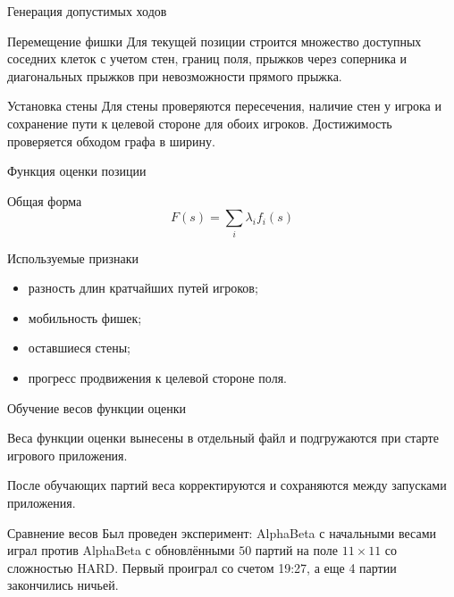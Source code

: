 \documentclass[fullscreen=true,russian,compress,%
    hyperref={unicode,bookmarks=false}]{presentation}
\begin{document}
\begin{frame}{Генерация допустимых ходов}
\begin{block}{Перемещение фишки}
Для текущей позиции строится множество доступных соседних клеток с учетом стен, границ поля, прыжков через соперника и диагональных прыжков при невозможности прямого прыжка.
\end{block}

\begin{block}{Установка стены}
Для стены проверяются пересечения, наличие стен у игрока и сохранение пути к целевой стороне для обоих игроков. Достижимость проверяется обходом графа в ширину.
\end{block}
\end{frame}

\begin{frame}{Функция оценки позиции}
\begin{block}{Общая форма}
\[
F(s)=\sum_i \lambda_i f_i(s)
\]
\end{block}

\begin{block}{Используемые признаки}
\begin{itemize}
    \item разность длин кратчайших путей игроков;
    \item мобильность фишек;
    \item оставшиеся стены;
    \item прогресс продвижения к целевой стороне поля.
\end{itemize}
\end{block}
\end{frame}

\begin{frame}{Обучение весов функции оценки}
\begin{block}{}
\small
Веса функции оценки вынесены в отдельный файл и подгружаются при старте игрового приложения.

\medskip
После обучающих партий веса корректируются и сохраняются между запусками приложения.
\end{block}

\begin{block}{Сравнение весов}
\small
Был проведен эксперимент: AlphaBeta с начальными весами играл против AlphaBeta с обновлёнными $50$ партий на поле $11\times11$ со сложностью HARD. Первый проиграл со счетом 19:27, а еще 4 партии закончились ничьей.

\end{block}
\end{frame}
\end{document}
